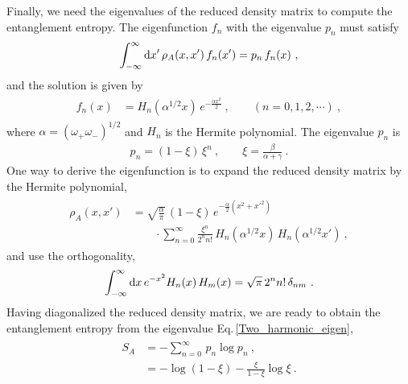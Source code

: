 Finally, we need the eigenvalues of the reduced density matrix to compute the entanglement entropy.
The eigenfunction $f_n$ with the eigenvalue $p_n$ must satisfy
\begin{align}
\int_{-\infty}^\infty \d x'\, \rho_A (x, x')\,f_n(x') = p_n\, f_n (x) \ ,
\end{align}
and the solution is given by 
\begin{align}\label{EigenTwoHarm}
\begin{aligned}
f_n (x) &= H_n (\alpha^{1/2} x)\, e^{-\frac{\alpha x^2}{2}} \ ,\qquad (n=0,1,2,\cdots) \ ,
\end{aligned}
\end{align}
where $\alpha = (\omega_+ \omega_-)^{1/2}$ and $H_n$ is the Hermite polynomial.
The eigenvalue $p_n$ is 
\begin{align}\label{Two_harmonic_eigen}
	p_n = (1-\xi)\,\xi^n \ , \qquad \xi = \frac{\beta}{\alpha + \gamma} \ .
\end{align}
One way to derive the eigenfunction is to expand the reduced density matrix by the Hermite polynomial,
\begin{align}
\begin{aligned}
	\rho_A (x, x') &= \sqrt{\frac{\alpha}{\pi}}\,(1-\xi)\,e^{-\frac{\alpha}{2}(x^2 + x'^2)} \\
		&\qquad \cdot \sum_{n=0}^\infty \frac{\xi^n}{2^n n!}  \,H_n(\alpha^{1/2} x) \,H_n(\alpha^{1/2} x') \ ,
\end{aligned}
\end{align}
and use the orthogonality,
\begin{align}
	\int_{-\infty}^\infty \mathrm{d} x\, e^{-x^2} H_n(x)\, H_m(x) = \sqrt{\pi}\,2^n  n!\,\delta_{nm} \ .
\end{align}
Having diagonalized the reduced density matrix, we are ready to obtain the entanglement entropy from the eigenvalue Eq.\,\eqref{Two_harmonic_eigen},
\begin{align}
\begin{aligned}
S_A &=- \sum_{n=0}^\infty\, p_n \log p_n \ , \\
	&= - \log(1-\xi) - \frac{\xi}{1-\xi}\log\xi \ .
\end{aligned}
\end{align}



